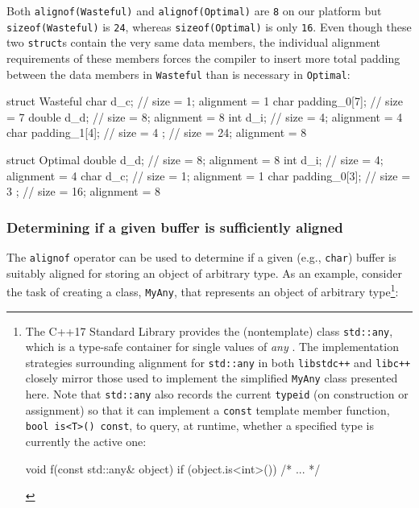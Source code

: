\noindent Both \lstinline!alignof(Wasteful)! and \lstinline!alignof(Optimal)! are
\lstinline!8! on our platform but \lstinline!sizeof(Wasteful)! is \lstinline!24!, whereas
\lstinline!sizeof(Optimal)! is only \lstinline!16!. Even though these two
\lstinline!struct!s contain the very same data members, the individual
alignment requirements of these members forces the compiler to insert
more total padding between the data members in \lstinline!Wasteful! than is
necessary in \lstinline!Optimal!:

\begin{emcppslisting}
struct Wasteful
{
    char   d_c;           // size =  1;  alignment = 1
    char   padding_0[7];  // size =  7
    double d_d;           // size =  8;  alignment = 8
    int    d_i;           // size =  4;  alignment = 4
    char   padding_1[4];  // size =  4
};                        // size = 24;  alignment = 8

struct Optimal
{
    double d_d;           // size =  8;  alignment = 8
    int    d_i;           // size =  4;  alignment = 4
    char   d_c;           // size =  1;  alignment = 1
    char   padding_0[3];  // size =  3
};                        // size = 16;  alignment = 8
\end{emcppslisting}


\subsubsection[Determining if a given buffer is sufficiently aligned]{Determining if a given buffer is sufficiently aligned}\label{determining-if-a-given-buffer-is-sufficiently-aligned}

The \lstinline!alignof! operator can be used to determine if a given (e.g.,
\lstinline!char!) buffer is suitably aligned for storing an object of
arbitrary type. As an example, consider the task of creating a
 class, \lstinline!MyAny!, that represents an object
of arbitrary type{\cprotect\footnote{The C++17 Standard Library provides
the (nontemplate) class \lstinline!std::any!, which is a type-safe
container for single values of \emph{any} . The
implementation strategies surrounding alignment for \lstinline!std::any!
in both \lstinline!libstdc++! and \lstinline!libc++! closely mirror those
used to implement the simplified \lstinline!MyAny! class presented here.
Note that \lstinline!std::any! also records the current \lstinline!typeid!
(on construction or assignment) so that it can implement a
\lstinline!const! template member function,
\lstinline!bool!~\lstinline!is<T>()!~\lstinline!const!, to query, at runtime,
whether a specified type is currently the active one:

\begin{emcppslisting}[style=footcode]
void f(const std::any& object)
{
    if (object.is<int>()) { /* ... */ }
}
\end{emcppslisting}
      }}:

